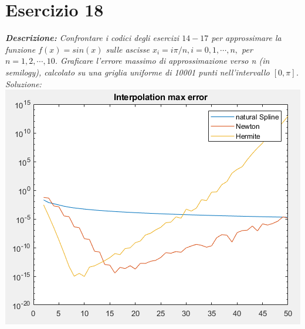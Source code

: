 \section{Esercizio 18}
\textit{\textbf{Descrizione:} Confrontare i codici degli esercizi $14-17$ per approssimare la funzione $f(x) = sin(x)$ sulle ascisse $x_{i} = i \pi/n, i = 0, 1, \cdots , n,$ per $n = 1, 2, \cdots, 10$. Graficare l'errore massimo di approssimazione verso n (in semilogy), calcolato su una griglia uniforme di 10001 punti nell'intervallo $[0, \pi]$.}\newline
\noindent\emph{Soluzione: }\newline
\includegraphics[width=1.3\linewidth]{img/errorInterp.png}